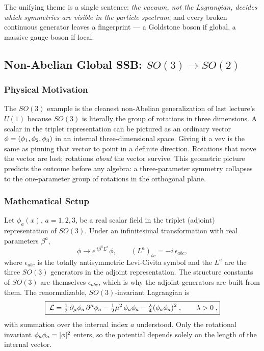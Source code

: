 The unifying theme is a single sentence: \emph{the vacuum, not the Lagrangian, decides which symmetries are visible in the particle spectrum}, and every broken continuous generator leaves a fingerprint --- a Goldstone boson if global, a massive gauge boson if local.

\subsection{\texorpdfstring{Non-Abelian Global SSB: $SO(3)\to SO(2)$}{Non-Abelian Global SSB: SO(3) to SO(2)}}\label{subsec:lec16:so3}

\subsubsection*{Physical Motivation}

The $SO(3)$ example is the cleanest non-Abelian generalization of last lecture's $U(1)$ because $SO(3)$ is literally the group of rotations in three dimensions. A scalar in the triplet representation can be pictured as an ordinary vector $\mathbf{\phi}=(\phi_1,\phi_2,\phi_3)$ in an internal three-dimensional space. Giving it a vev is the same as pinning that vector to point in a definite direction. Rotations that move the vector are lost; rotations \emph{about} the vector survive. This geometric picture predicts the outcome before any algebra: a three-parameter symmetry collapses to the one-parameter group of rotations in the orthogonal plane.

\subsubsection*{Mathematical Setup}

Let $\phi_a(x)$, $a=1,2,3$, be a real scalar field in the triplet (adjoint) representation of $SO(3)$. Under an infinitesimal transformation with real parameters $\beta^a$,
\begin{equation}
  \phi \to e^{\,i\beta^a L^a}\phi,
  \qquad
  (L^a)_{bc}=-i\,\epsilon_{abc},
  \label{eq:lec16:so3_generators}
\end{equation}
where $\epsilon_{abc}$ is the totally antisymmetric Levi-Civita symbol and the $L^a$ are the three $SO(3)$ generators in the adjoint representation. The structure constants of $SO(3)$ are themselves $\epsilon_{abc}$, which is why the adjoint generators are built from them. The renormalizable, $SO(3)$-invariant Lagrangian is
\begin{equation}
  \boxed{\;\mathcal{L}
  =\tfrac12\,\partial_\mu\phi_a\,\partial^\mu\phi_a
   -\tfrac12\mu^2\,\phi_a\phi_a
   -\tfrac{\lambda}{4}(\phi_a\phi_a)^2\; ,\qquad \lambda>0\; ,}
  \label{eq:lec16:so3_lagrangian}
\end{equation}
with summation over the internal index $a$ understood. Only the rotational invariant $\phi_a\phi_a=|\mathbf{\phi}|^2$ enters, so the potential depends solely on the length of the internal vector.

